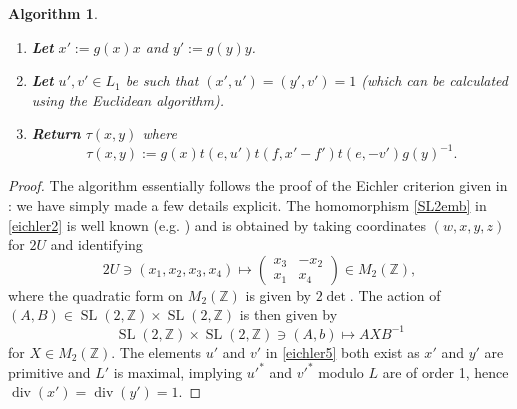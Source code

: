 \documentclass[12pt, a4paper]{article}
\newtheorem{algo}{Algorithm}[section]
\newcommand{\ZZ}{\mathbb{Z}}
\newcommand{\beq}{\begin{equation*}}
\newcommand{\eeq}{\end{equation*}}
\newcommand{\opn}{\operatorname}
\newcommand{\bpm}{\begin{pmatrix}}
\newcommand{\epm}{\end{pmatrix}}
\begin{document}
\begin{algo}
\begin{enumerate}
\begin{enumerate}
    \end{enumerate}
  \item  \textbf{Let} $x':=g(x) x$ and $y':=g(y) y$. \label{eichler4}
  \item \textbf{Let} $u', v' \in L_1$ be such that $(x',u')=(y',v')=1$ (which can be calculated using the Euclidean algorithm). \label{eichler5}
  \item \textbf{Return} $\tau(x,y)$ where \label{eichler6}
\beq
\tau(x,y):=g(x) t(e, u') t(f, x'-f') t(e, -v') g(y)^{-1}.
\eeq
  \end{enumerate}
\end{algo}
\begin{proof}
  The algorithm essentially follows the proof of the Eichler criterion given in  \cite[Proposition 3.3]{abelianisation}: we have simply made a few details explicit.
  The homomorphism \eqref{SL2emb} in \ref{eichler2} is well known (e.g. \cite{Sterk}) and is obtained by taking coordinates $(w,x,y,z)$ for $2U$ and identifying
  \beq
  2U \ni (x_1,x_2,x_3,x_4) \mapsto
  \bpm 
  x_3 & - x_2 \\
  x_1 & x_4
  \epm \in M_2(\ZZ),
  \eeq
  where the quadratic form on $M_2(\ZZ)$ is given by $2 \opn{det}$.
  The action of $(A,B) \in \opn{SL}(2, \ZZ) \times \opn{SL}(2, \ZZ)$ is then given by
  \beq
  \opn{SL}(2, \ZZ) \times \opn{SL}(2, \ZZ) \ni (A, b) \mapsto A X B^{-1}
  \eeq
  for $X \in M_2(\ZZ)$.
  The elements $u'$ and $v'$ in \ref{eichler5} both exist as $x'$ and $y'$ are primitive and $L'$ is maximal, implying $u'^*$ and $v'^*$ modulo $L$ are of order 1, hence $\opn{div}(x') = \opn{div}(y')=1$.
\end{proof}
\end{document}
